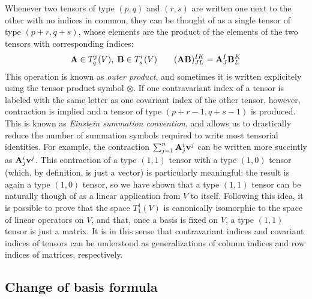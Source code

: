 Whenever two tensors of type $(p,q)$ and $(r,s)$ are written
one next to the other with no indices in common, they can be thought
of as a single tensor of type $(p+r,q+s)$, whose elements are
the product of the elements of the two tensors with corresponding indices:
\[
\mathbf{A} \in T^p_q(V), \; \mathbf{B} \in T^r_s(V) \qquad
(\mathbf{AB})^{IK}_{JL} = \mathbf{A}^I_J \mathbf{B}^K_L
\]
This operation is known as \emph{outer product}, and sometimes
it is written explicitely using the tensor product symbol $\otimes$.
If one contravariant index of a tensor is labeled with the same letter
as one covariant index of the other tensor, however,
contraction is implied and a tensor of type $(p+r-1,q+s-1)$ is produced.
This is known as \emph{Einstein summation convention}, and allows us
to drastically reduce the number of summation symbols required
to write most tensorial identities. For example, the contraction
$\sum_{j=1}^n \mathbf{A}^i_j \mathbf{v}^j$
can be written more succintly as $\mathbf{A}^i_j \mathbf{v}^j$.
This contraction of a type $(1,1)$ tensor with a type $(1,0)$ tensor
(which, by definition, is just a vector) is particularly meaningful:
the result is again a type $(1,0)$ tensor, so we have shown that a type
$(1,1)$ tensor can be naturally though of as a linear application from $V$
to itself. Following this idea, it is possible to prove that the space
$T^1_1(V)$ is canonically isomorphic to the space of linear operators on $V$,
and that, once a basis is fixed on $V$, a type $(1,1)$ tensor is just a matrix.
It is in this sense that contravariant indices and covariant indices
of tensors can be understood as generalizations of column indices
and row indices of matrices, respectively.

\subsection*{Change of basis formula}

